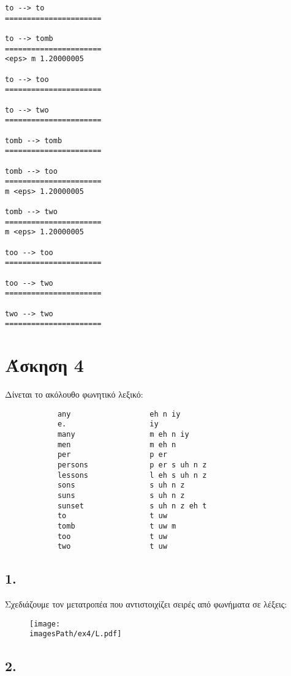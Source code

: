 \documentclass[12pt,a4paper]{article}
\newcommand{\imagesPath}{/home/nick/shmmy/8th/slp/slp-ntua/set2}
\begin{document}
\begin{verbatim}
to --> to
======================

to --> tomb
======================
<eps> m 1.20000005

to --> too
======================

to --> two
======================

tomb --> tomb
======================

tomb --> too
======================
m <eps> 1.20000005

tomb --> two
======================
m <eps> 1.20000005

too --> too
======================

too --> two
======================

two --> two
======================
			\end{verbatim}
			
	
	\section*{Άσκηση 4} 
		Δίνεται το ακόλουθο φωνητικό λεξικό:
		
		\begin{verbatim}
			any                  eh n iy
			e.                   iy
			many                 m eh n iy
			men                  m eh n
			per                  p er
			persons              p er s uh n z
			lessons              l eh s uh n z
			sons                 s uh n z
			suns                 s uh n z
			sunset               s uh n z eh t
			to                   t uw
			tomb                 t uw m
			too                  t uw
			two                  t uw
		\end{verbatim}
		
		\subsection*{1.}
			Σχεδιάζουμε τον μετατροπέα που αντιστοιχίζει σειρές από φωνήματα σε λέξεις:
			
			\begin{figure}[H]
				\begin{center}
					\texttt{[image: \\imagesPath/ex4/L.pdf]}
				\end{center}
			\end{figure}
		
		\subsection*{2.}
			
\end{document}
